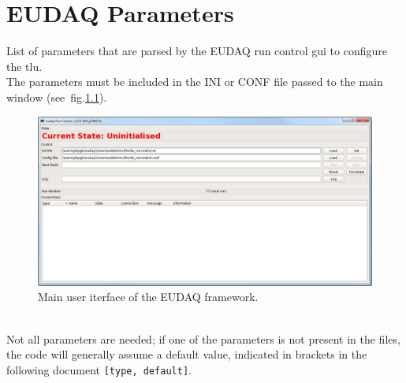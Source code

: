 \chapter{EUDAQ Parameters}\label{ch:EUDAQPar}
List of parameters that are parsed by the EUDAQ run control \gls{gui} to configure the \gls{tlu}.\\
The parameters must be included in the INI or CONF file passed to the main window (see~fig.\ref{fig:EUDAQGui}).
\begin{figure}
  \centering
  \includegraphics[width=.90\textwidth]{./Images/RunControlGUI.jpg}
  \caption{Main user iterface of the EUDAQ framework.}
  \label{fig:EUDAQGui}
\end{figure}\\
Not all parameters are needed; if one of the parameters is not present in the files, the code will generally assume a default value, indicated in brackets in the following document \verb|[type, default]|.
